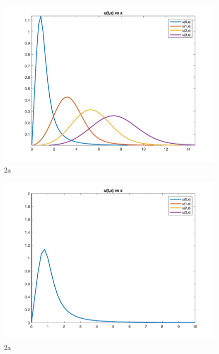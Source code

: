 \documentclass{article}
\begin{document}


\begin{figure}[H]
  \includegraphics[width=\linewidth]{docs/2a.png}
  \caption{2a}
\end{figure}


\begin{figure}[H]
  \includegraphics[width=\linewidth]{docs/2c.png}
  \caption{2a}
\end{figure}
\end{document}

